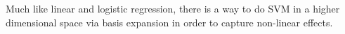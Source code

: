 \documentclass[xetex,mathserif,serif,aspectratio=169]{beamer}
\begin{document}
{
\begin{frame}[plain]
\end{frame}
}

\begin{frame}[fragile] \frametitle{} \oldB \small

\textbf{}

Much like linear and logistic regression, there is a way to do SVM in a higher
dimensional space via basis expansion in order to capture non-linear effects.

\end{frame}
\end{document}
